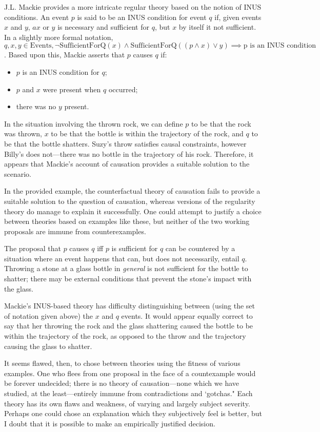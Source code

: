 \documentclass{article}
\begin{document}
J.L. Mackie provides a more intricate regular theory based on the notion of INUS conditions. An event $p$ is said to be an INUS condition for event $q$ if, given events $x$ and $y$, $ax$ or $y$ is necessary and sufficient for $q$, but $x$ by itself it not sufficient. In a slightly more formal notation, $q, x, y \in \text{Events}, \lnot\mathrm{SufficientForQ}(x) \land \mathrm{SufficientForQ}((p \land x) \lor y) \implies \text{p is an INUS condition}$. Based upon this, Mackie asserts that $p$ causes $q$ if:

    \begin{itemize}
    \item $p$ is an INUS condition for $q$;
    \item $p$ and $x$ were present when $q$ occurred;
    \item there was no $y$ present.
    \end{itemize}

In the situation involving the thrown rock, we can define $p$ to be that the rock was thrown, $x$ to be that the bottle is within the trajectory of the rock, and $q$ to be that the bottle shatters. Suzy's throw satisfies causal constraints, however Billy's does not---there was no bottle in the trajectory of his rock. Therefore, it appears that Mackie's account of causation provides a suitable solution to the scenario.

\medbreak

In the provided example, the counterfactual theory of causation fails to provide a suitable solution to the question of causation, whereas versions of the regularity theory do manage to explain it successfully. One could attempt to justify a choice between theories based on examples like these, but neither of the two working proposals are immune from counterexamples.

The proposal that $p$ causes $q$ iff $p$ is sufficient for $q$ can be countered by a situation where an event happens that can, but does not necessarily, entail $q$. Throwing a stone at a glass bottle in \textit{general} is not sufficient for the bottle to shatter; there may be external conditions that prevent the stone's impact with the glass.

Mackie's INUS-based theory has difficulty distinguishing between (using the set of notation given above) the $x$ and $q$ events. It would appear equally correct to say that her throwing the rock and the glass shattering caused the bottle to be within the trajectory of the rock, as opposed to the throw and the trajectory causing the glass to shatter.

It seems flawed, then, to chose between theories using the fitness of various examples. One who flees from one proposal in the face of a countexample would be forever undecided; there is no theory of causation---none which we have studied, at the least---entirely immune from contradictions and `gotchas." Each theory has its own flaws and weakness, of varying and largely subject severity. Perhaps one could chose an explanation which they subjectively feel is better, but I doubt that it is possible to make an empirically justified decision.
\end{document}

